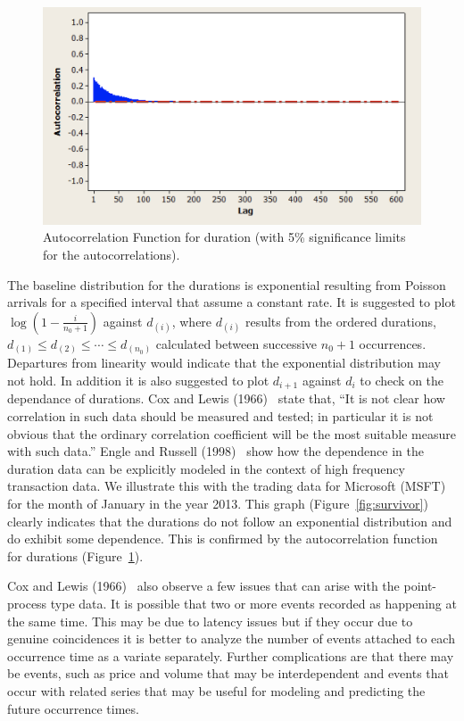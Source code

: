 	\begin{figure}[!ht]
	\centering
	 \includegraphics[width=\textwidth]{chapters/chapter_advanced/figures/Sec2-10Fig7.png}
	\caption{Autocorrelation Function for duration (with 5\% significance limits for the autocorrelations). \label{fig:duration}}
	\end{figure}
 
 The baseline distribution for the durations is exponential resulting from Poisson arrivals for a specified interval that assume a constant rate. It is suggested to plot $\log(1 - \frac{i}{n_0+1})$ against $d_{(i)}$, where $d_{(i)}$ results from the ordered durations, $d_{(1)} \leq d_{(2)} \leq \cdots \leq d_{(n_0)}$ calculated between successive $n_0 + 1$ occurrences. Departures from linearity would indicate that the exponential distribution may not hold. In addition it is also suggested to plot $d_{i+1}$ against $d_i$ to check on the dependance of durations. Cox and Lewis (1966)~\cite[p.14]{cox1966} state that, ``It is not clear how correlation in such data should be measured and tested; in particular it is not obvious that the ordinary correlation coefficient will be the most suitable measure with such data.'' Engle and Russell (1998)~\cite{engle1998} show how the dependence in the duration data can be explicitly modeled in the context of high frequency transaction data. We illustrate this with the trading data for Microsoft (MSFT) for the month of January in the year 2013. This graph (Figure~\ref{fig:survivor}) clearly indicates that the durations do not follow an exponential distribution and do exhibit some dependence. This is confirmed by the autocorrelation function for durations (Figure~\ref{fig:duration}).


Cox and Lewis (1966)~\cite{cox1966} also observe a few issues that can arise with the point-process type data. It is possible that two or more events recorded as happening at the same time. This may be due to latency issues but if they occur due to genuine coincidences it is better to analyze the number of events attached to each occurrence time as a variate separately. Further complications are that there may be events, such as price and volume that may be interdependent and events that occur with related series that may be useful for modeling and predicting the future occurrence times.



